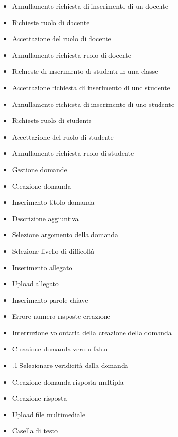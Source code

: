\begin{itemize}
	\item {} Annullamento richiesta di inserimento di un docente
	\item {} Richieste ruolo di docente
	\item {} Accettazione del ruolo di docente
	\item {} Annullamento richiesta ruolo di docente
	\item {} Richieste di inserimento di studenti in una classe
	\item {} Accettazione richiesta di inserimento di uno studente
	\item {} Annullamento richiesta di inserimento di uno studente
	\item {} Richieste ruolo di studente
	\item {} Accettazione del ruolo di studente
	\item {} Annullamento richiesta ruolo di studente
	\item {} Gestione domande 
	\item {} Creazione domanda 
	\item {} Inserimento titolo domanda 
	\item {} Descrizione aggiuntiva
	\item {} Selezione argomento della domanda 
	\item {} Selezione livello di difficoltà 
	\item {} Inserimento allegato 
	\item {} Upload allegato 
	\item {} Inserimento parole chiave
	\item {} Errore numero risposte creazione
	\item {} Interruzione volontaria della creazione della domanda
	\item {} Creazione domanda vero o falso
	\item {}.1 Selezionare veridicità della domanda 
	\item {} Creazione domanda risposta multipla 
	\item {} Creazione risposta
	\item {} Upload file multimediale
	\item {} Casella di testo 

\end{itemize}
